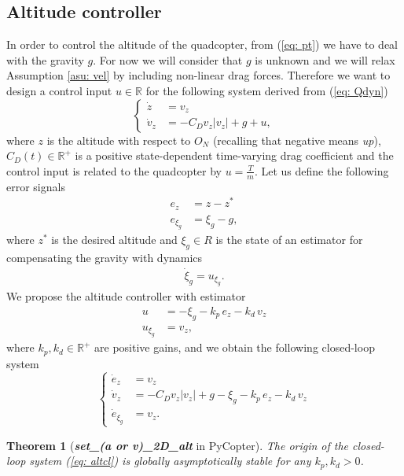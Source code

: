 \documentclass[a4paper, onecolumn]{ieeeconf}
\newcommand{\R}{\ensuremath{\mathbb R}}
\newtheorem{theorem}{\textbf{Theorem}}[section]
\begin{document}
\subsection{Altitude controller}
In order to control the altitude of the quadcopter, from (\ref{eq: pt}) we have to deal with the gravity $g$. For now we will consider that $g$ is unknown and we will relax Assumption \ref{asu: vel} by including non-linear drag forces. Therefore we want to design a control input $u\in\R$ for the following system derived from (\ref{eq: Qdyn})
\begin{equation}
	\begin{cases}
		\dot z &= v_z \\
		\dot v_z &= -C_Dv_z|v_z| + g + u,
\end{cases}
\label{eq: altdyn}
\end{equation}
where $z$ is the altitude with respect to $O_N$ (recalling that negative means \emph{up}), $C_D(t)\in\R^+$ is a positive state-dependent time-varying drag coefficient and the control input is related to the quadcopter by $u = \frac{T}{m}$. Let us define the following error signals
\begin{align}
	e_z &= z - z^* \\
	e_{\xi_g} &= \xi_g - g,
\end{align}
where $z^*$ is the desired altitude and $\xi_g\in R$ is the state of an estimator for compensating the gravity with dynamics
\begin{align}
	\dot\xi_g = u_{\xi_g}.
	\label{eq: xigdyn}
\end{align}
We propose the altitude controller with estimator
\begin{align}
	u &= -\xi_g -k_p\,e_z -k_d\,v_z \label{eq: ualt1} \\
	u_{\xi_g} &= v_z, \label{eq: ualt2}
\end{align}
where $k_p, k_d\in\R^+$ are positive gains, and we obtain the following closed-loop system
\begin{equation}
	\begin{cases}
	\dot e_z &= v_z \\
	\dot v_z &= -C_Dv_z|v_z| + g -\xi_g -k_p\,e_z -k_d\,v_z \\
	\dot e_{\xi_g} &= v_z.
	\end{cases}
	\label{eq: altcl}
\end{equation}
\begin{theorem}[\emph{\bf set\_(a or v)\_2D\_alt} in PyCopter]
	\label{thm: alt}
	The origin of the closed-loop system (\ref{eq: altcl}) is globally asymptotically stable for any $k_p, k_d>0$.
\end{theorem}
\end{document}
